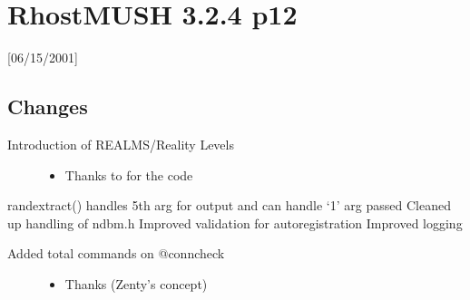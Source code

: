 \documentclass[letterpaper,10pt,english]{sphinxmanual}
\begin{document}
\section{RhostMUSH 3.2.4 p12}
\label{\detokenize{changelog:rhostmush-3-2-4-p12}}\label{\detokenize{changelog:changelog-3-2-4p12}}
\sphinxAtStartPar
{[}06/15/2001{]}


\subsection{Changes}
\label{\detokenize{changelog:id33}}\begin{description}
\item[{Introduction of REALMS/Reality Levels}] \leavevmode\begin{itemize}
\item {} 
\sphinxAtStartPar
Thanks to  for the code

\end{itemize}

\end{description}

\sphinxAtStartPar
randextract() handles 5th arg for output and can handle ‘1’ arg passed
Cleaned up handling of ndbm.h
Improved validation for autoregistration
Improved logging
\begin{description}
\item[{Added total commands on @conncheck}] \leavevmode\begin{itemize}
\item {} 
\sphinxAtStartPar
Thanks  (Zenty’s concept)

\end{itemize}

\end{description}
\end{document}
